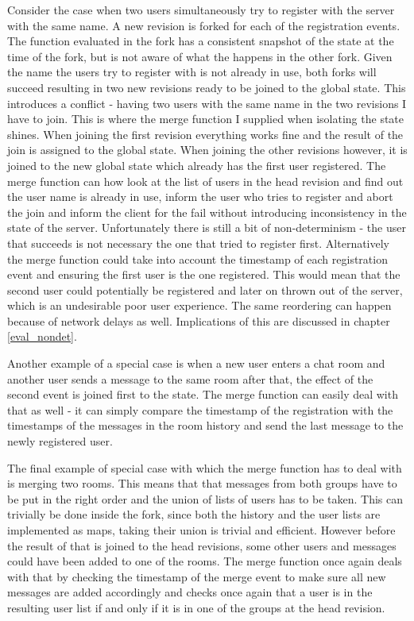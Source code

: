 \documentclass[12pt,twoside,notitlepage]{report}
\begin{document}
{Consider the case when two users simultaneously try to register with the server with the same name. A new revision is forked for each of the registration events. The function evaluated in the fork has a consistent snapshot of the state at the time of the fork, but is not aware of what the happens in the other fork. Given the name the users try to register with is not already in use, both forks will succeed resulting in two new revisions ready to be joined to the global state. This introduces a conflict - having two users with the same name in the two revisions I have to join. This is where the merge function I supplied when isolating the state shines. When joining the first revision everything works fine and the result of the join is assigned to the global state. When joining the other revisions however, it is joined to the new global state which already has the first user registered. The merge function can how look at the list of users in the head revision and find out the user name is already in use, inform the user who tries to register and abort the join and inform the client for the fail without introducing inconsistency in the state of the server. Unfortunately there is still a bit of non-determinism - the user that succeeds is not necessary the one that tried to register first. Alternatively the merge function could take into account the timestamp of each registration event and ensuring the first user is the one registered. This would mean that the second user could potentially be registered and later on thrown out of the server, which is an undesirable poor user experience. The same reordering can happen because of network delays as well. Implications of this are discussed in chapter \ref{eval_nondet}.

Another example of a special case is when a new user enters a chat room and another user sends a message to the same room after that, the effect of the second event is joined first to the state. The merge function can easily deal with that as well - it can simply compare the timestamp of the registration with the timestamps of the messages in the room history and send the last message to the newly registered user.

The final example of special case with which the merge function has to deal with is merging two rooms. This means that that messages from both groups have to be put in the right order and the union of lists of users has to be taken. This can trivially be done inside the fork, since both the history and the user lists are implemented as maps, taking their union is trivial and efficient. However before the result of that is joined to the head revisions, some other users and messages could have been added to one of the rooms. The merge function once again deals with that by checking the timestamp of the merge event to make sure all new messages are added accordingly and checks once again that a user is in the resulting user list if and only if it is in one of the groups at the head revision.

}
\end{document}
